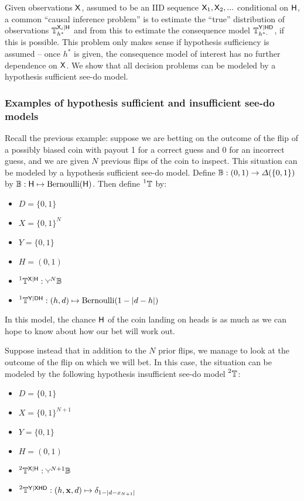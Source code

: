 Given observations $\mathsf{X}$, assumed to be an IID sequence $\mathsf{X}_1,\mathsf{X}_2,...$ conditional on $\mathsf{H}$, a common ``causal inference problem'' is to estimate the ``true'' distribution of observations $\mathbb{T}^{\mathsf{X}_i|\mathsf{H}}_{h^*}$ and from this to estimate the consequence model $\mathbb{T}^{\mathsf{Y}|\mathsf{H}\mathsf{D}}_{h^*\cdot}$, if this is possible. This problem only makes sense if hypothesis sufficiency is assumed -- once $h^*$ is given, the consequence model of interest has no further dependence on $\mathsf{X}$. We show that all decision problems can be modeled by a hypothesis sufficient see-do model.


\subsubsection{Examples of hypothesis sufficient and insufficient see-do models}

Recall the previous example: suppose we are betting on the outcome of the flip of a possibly biased coin with payout 1 for a correct guess and 0 for an incorrect guess, and we are given $N$ previous flips of the coin to inspect. This situation can be modeled by a hypothesis sufficient see-do model. Define $\mathbb{B}:(0,1)\to \Delta(\{0,1\})$ by $\mathbb{B}:\mathsf{H}\mapsto \mathrm{Bernoulli}(\mathsf{H})$. Then define $\prescript{1}{}{\ensuremath{\mathbb{T}}}$ by:

\begin{itemize}
    \item $D=\{0,1\}$
    \item $X=\{0,1\}^N$
    \item $Y=\{0,1\}$
    \item $H=(0,1)$
    \item $\prescript{1}{}{\kernel{T}}^{\RV{X}|\RV{H}}:\splitter{0.1}^N\kernel{B}$
    \item $\prescript{1}{}{\ensuremath{\mathbb{T}}}^{\mathsf{Y}|\mathsf{D}\mathsf{H}}:(h,d)\mapsto \mathrm{Bernoulli}(1-|d-h|)$
\end{itemize}

In this model, the chance $\mathsf{H}$ of the coin landing on heads is as much as we can hope to know about how our bet will work out.

Suppose instead that in addition to the $N$ prior flips, we manage to look at the outcome of the flip on which we will bet. In this case, the situation can be modeled by the following hypothesis insufficient see-do model $\prescript{2}{}{\ensuremath{\mathbb{T}}}$:

\begin{itemize}
    \item $D=\{0,1\}$
    \item $X=\{0,1\}^{N+1}$
    \item $Y=\{0,1\}$
    \item $H=(0,1)$
    \item $\prescript{2}{}{\kernel{T}}^{\RV{X}|\RV{H}}:\splitter{0.1}^{N+1}\kernel{B}$
    \item $\prescript{2}{}{\ensuremath{\mathbb{T}}}^{\mathsf{Y}|\mathsf{X}\mathsf{H}\mathsf{D}}:(h,\mathbf{x},d)\mapsto \delta_{1-|d-x_{N+1}|}$
\end{itemize}

